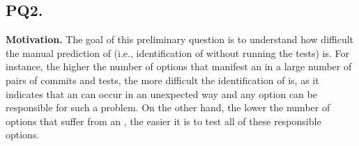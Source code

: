 \subsection*{\textbf{PQ2. \PQII}}

\noindent \textbf{Motivation.}
The goal of this preliminary question is to understand how difficult the manual prediction of \inconsistent (i.e., identification of \inconsistent without running the tests) is. For instance, the higher the number of options that manifest an \inconsistent in a large number of pairs of commits and tests, the more difficult the identification of \inconsistent is, as it indicates that an \inconsistent can occur in an unexpected way and any option can be responsible for such a problem. On the other hand, the lower the number of options that suffer from an \inconsistent, the easier it is to test all of these \inconsistent responsible options. 

